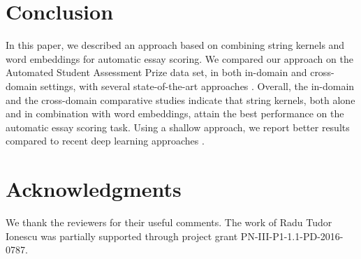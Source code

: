 \documentclass[11pt,a4paper]{article}
\begin{document}
\vspace*{-0.2cm} 
\section{Conclusion}
\label{sec_Conclusion}
\vspace*{-0.1cm} 

In this paper, we described an approach based on combining string kernels and word embeddings for automatic essay scoring. We compared our approach on the Automated Student Assessment Prize data set, in both in-domain and cross-domain settings, with several state-of-the-art approaches \cite{Phandi-EMNLP-2015,Dong-EMNLP-2016,Dong-CONLL-2017,Tay-ACL-2018}. Overall, the in-domain and the cross-domain comparative studies indicate that string kernels, both alone and in combination with word embeddings, attain the best performance on the automatic essay scoring task. Using a shallow approach, we report better results compared to recent deep learning approaches \cite{Dong-EMNLP-2016,Dong-CONLL-2017,Tay-ACL-2018}.

\section*{Acknowledgments}
We thank the reviewers for their useful comments. The work of Radu Tudor Ionescu was partially supported through project grant PN-III-P1-1.1-PD-2016-0787.



\end{document}
